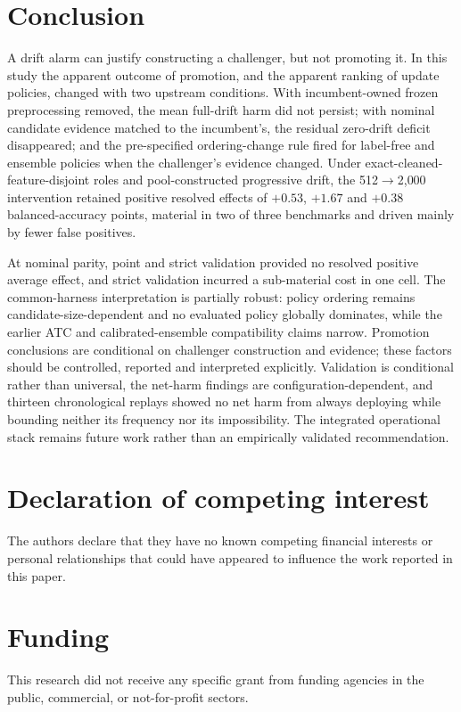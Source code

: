\documentclass[a4paper,fleqn]{cas-sc}
\begin{document}
\section{Conclusion}


A drift alarm can justify constructing a challenger, but not promoting it. In this study the apparent outcome of promotion, and the apparent ranking of update policies, changed with two upstream conditions. With incumbent-owned frozen preprocessing removed, the mean full-drift harm did not persist; with nominal candidate evidence matched to the incumbent's, the residual zero-drift deficit disappeared; and the pre-specified ordering-change rule fired for label-free and ensemble policies when the challenger's evidence changed. Under exact-cleaned-feature-disjoint roles and pool-constructed progressive drift, the 512$\to$2{,}000 intervention retained positive resolved effects of $+0.53$, $+1.67$ and $+0.38$ balanced-accuracy points, material in two of three benchmarks and driven mainly by fewer false positives.

At nominal parity, point and strict validation provided no resolved positive average effect, and strict validation incurred a sub-material cost in one cell. The common-harness interpretation is partially robust: policy ordering remains candidate-size-dependent and no evaluated policy globally dominates, while the earlier ATC and calibrated-ensemble compatibility claims narrow. Promotion conclusions are conditional on challenger construction and evidence; these factors should be controlled, reported and interpreted explicitly. Validation is conditional rather than universal, the net-harm findings are configuration-dependent, and thirteen chronological replays showed no net harm from always deploying while bounding neither its frequency nor its impossibility. The integrated operational stack remains future work rather than an empirically validated recommendation.




\section*{Declaration of competing interest}
The authors declare that they have no known competing financial interests or personal relationships that
could have appeared to influence the work reported in this paper.

\section*{Funding}
This research did not receive any specific grant from funding agencies in the public, commercial, or
not-for-profit sectors.
\end{document}

